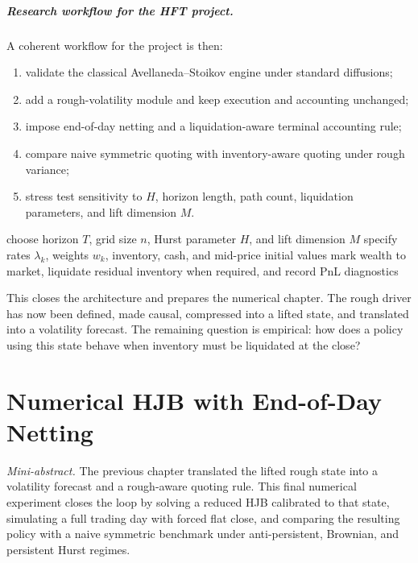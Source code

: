 \documentclass[a4paper,10pt,titlepage,oneside,openany]{book}
\theoremstyle{plain}
\theoremstyle{definition}
\theoremstyle{remark}
\newcommand{\miniabstract}[1]{%
\vspace{-2pt}
\begin{tcolorbox}[colback=gray!6,colframe=black!15,boxrule=0.3pt,arc=3pt,left=6pt,right=6pt,top=4pt,bottom=4pt]
\textit{Mini-abstract.} #1
\end{tcolorbox}
\vspace{-4pt}
}
\newcommand{\1}{\mathbf{1}}
\begin{document}
\paragraph{Research workflow for the HFT project.}

A coherent workflow for the project is then:
\begin{enumerate}[label=\arabic*.]
    \item validate the classical Avellaneda--Stoikov engine under standard diffusions;
    \item add a rough-volatility module and keep execution and accounting unchanged;
    \item impose end-of-day netting and a liquidation-aware terminal accounting rule;
    \item compare naive symmetric quoting with inventory-aware quoting under rough variance;
    \item stress test sensitivity to \(H\), horizon length, path count, liquidation parameters, and lift dimension \(M\).
\end{enumerate}

\begin{algorithm}[H]
\small
\caption{From rough driver to market-making simulation}
\DontPrintSemicolon
choose horizon \(T\), grid size \(n\), Hurst parameter \(H\), and lift dimension \(M\)\;
specify rates \(\lambda_k\), weights \(w_k\), inventory, cash, and mid-price initial values\;
mark wealth to market, liquidate residual inventory when required, and record PnL diagnostics\;
\end{algorithm}

This closes the architecture and prepares the numerical chapter. The rough driver has now been defined, made causal, compressed into a lifted state, and translated into a volatility forecast. The remaining question is empirical: how does a policy using this state behave when inventory must be liquidated at the close?

\chapter{Numerical HJB with End-of-Day Netting}
\miniabstract{The previous chapter translated the lifted rough state into a volatility forecast and a rough-aware quoting rule. This final numerical experiment closes the loop by solving a reduced HJB calibrated to that state, simulating a full trading day with forced flat close, and comparing the resulting policy with a naive symmetric benchmark under anti-persistent, Brownian, and persistent Hurst regimes.}
\end{document}
